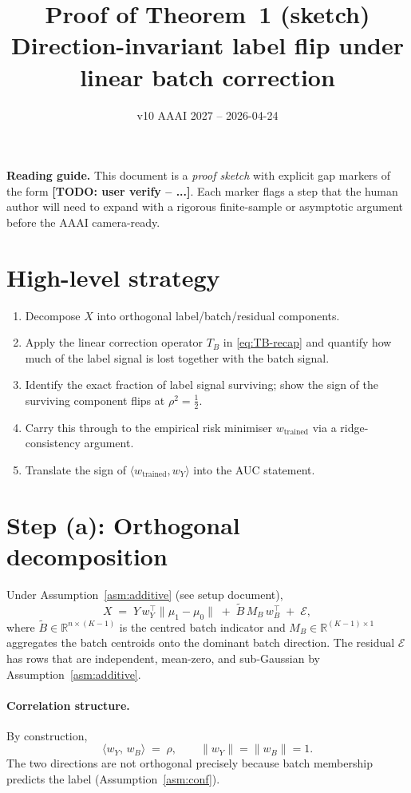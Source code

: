 \documentclass[11pt,a4paper]{article}
\title{Proof of Theorem~1 (sketch)\\
\large Direction-invariant label flip under linear batch correction}
\date{v10 AAAI 2027 -- 2026-04-24}
\newcommand{\R}{\mathbb{R}}
\newcommand{\TODO}[1]{\textbf{[TODO: user verify -- #1]}}
\begin{document}
\maketitle

\noindent\textbf{Reading guide.} This document is a \emph{proof sketch}
with explicit gap markers of the form \TODO{...}. Each marker flags a
step that the human author will need to expand with a rigorous
finite-sample or asymptotic argument before the AAAI camera-ready.

\section{High-level strategy}
\begin{enumerate}
\item[(a)] Decompose $X$ into orthogonal label/batch/residual components.
\item[(b)] Apply the linear correction operator $T_B$ in
  \eqref{eq:TB-recap} and quantify how much of the
  label signal is lost together with the batch signal.
\item[(c)] Identify the exact fraction of label signal surviving; show
  the sign of the surviving component flips at $\rho^2=\tfrac12$.
\item[(d)] Carry this through to the empirical risk minimiser
  $w_{\text{trained}}$ via a ridge-consistency argument.
\item[(e)] Translate the sign of $\langle w_{\text{trained}}, w_Y\rangle$
  into the AUC statement.
\end{enumerate}

\section{Step (a): Orthogonal decomposition}

Under Assumption~\ref{asm:additive} (see setup document),
\begin{equation}
  X \;=\; Y\,w_Y^{\!\top}\lVert\mu_1-\mu_0\rVert
     \;+\; \tilde B\,M_B\,w_B^{\!\top}
     \;+\; \mathcal{E},
  \label{eq:decomp}
\end{equation}
where $\tilde B\in\R^{n\times (K-1)}$ is the centred batch indicator and
$M_B\in\R^{(K-1)\times 1}$ aggregates the batch centroids onto the
dominant batch direction. The residual $\mathcal{E}$ has rows that are
independent, mean-zero, and sub-Gaussian by Assumption~\ref{asm:additive}.

\paragraph{Correlation structure.} By construction,
\begin{equation}
  \bigl\langle w_Y,\, w_B \bigr\rangle \;=\; \rho,
  \qquad
  \lVert w_Y\rVert = \lVert w_B\rVert = 1.
  \label{eq:wywb}
\end{equation}
The two directions are not orthogonal precisely because batch membership
predicts the label (Assumption~\ref{asm:conf}).
\end{document}
